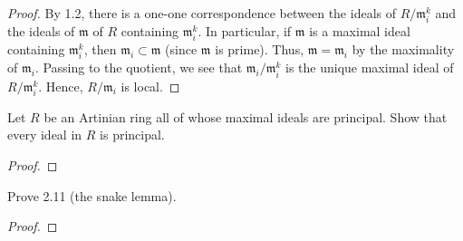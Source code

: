 \begin{proof}
By 1.2, there is a one-one correspondence between the ideals of
$R/\mathfrak{m}_i^k$ and the ideals of $\mathfrak{m}$ of $R$
containing $\mathfrak{m}_i^k$. In particular, if $\mathfrak{m}$
is a maximal ideal containing $\mathfrak{m}_i^k$, then
$\mathfrak{m}_i\subset\mathfrak{m}$ (since $\mathfrak{m}$ is
prime). Thus, $\mathfrak{m}=\mathfrak{m}_i$ by the maximality of
$\mathfrak{m}_i$. Passing to the quotient, we see that
$\mathfrak{m}_i/\mathfrak{m}_i^k$ is the unique maximal ideal of
$R/\mathfrak{m}_i^k$. Hence, $R/\mathfrak{m}_i$ is local.
\end{proof}
\newpage
\begin{problem}
Let $R$ be an Artinian ring all of whose maximal ideals are
principal. Show that every ideal in $R$ is principal.
\end{problem}
\begin{proof}
\end{proof}
\newpage
\begin{problem}
Prove 2.11 (the snake lemma).
\end{problem}
\begin{proof}
\end{proof}

